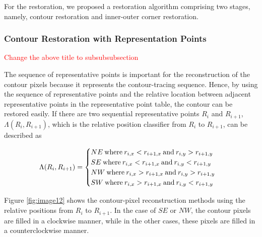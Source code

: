 
For the restoration, we proposed a restoration algorithm comprising two stages, namely, contour restoration and inner-outer corner restoration.

\subsubsection{Contour Restoration with Representation Points}

\textcolor{red}{Change the above title to subsubsubsection}


The sequence of representative points is important for the reconstruction of the contour pixels because it represents the contour-tracing sequence. Hence, by using the sequence of representative points and the relative location between adjacent representative points in the representative point table, the contour can be restored easily. If there are two sequential representative points $R_i$ and $R_{i+1}$, $\Lambda(R_i, R_{i+1})$, which is the relative position classifier from $R_i$ to $R_{i+1}$, can be described as 

\begin{equation}
	\Lambda(R_i, R_{i+1}) = \begin{cases}
	NE\: \text{where\:} r_{i,x} < r_{i+1,x}\: \text{and\:} r_{i,y} > r_{i+1,y} \\ 
	SE\: \text{where\:} r_{i,x} < r_{i+1,x}\: \text{and\:} r_{i,y} < r_{i+1,y} \\ 
	NW\: \text{where\:} r_{i,x} > r_{i+1,x}\: \text{and\:} r_{i,y} > r_{i+1,y} \\ 
	SW\: \text{where\:} r_{i,x} > r_{i+1,x}\: \text{and\:} r_{i,y} < r_{i+1,y}
	\end{cases}
	\label{eq:lambda}
\end{equation}

Figure \ref{fig:image12} shows the contour-pixel reconstruction methods using the relative positions from $R_i$ to $R_{i+1}$. In the case of $SE$ or $NW$, the contour pixels are filled in a clockwise manner, while in the other cases, these pixels are filled in a counterclockwise manner.

